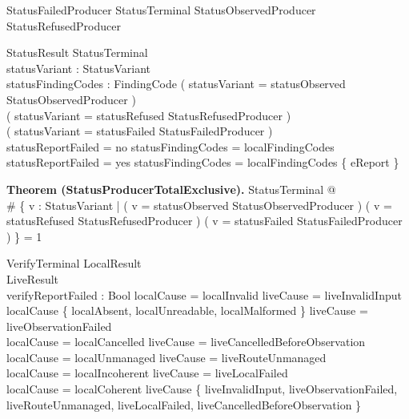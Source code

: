 \documentclass{article}
\makeatletter
\newenvironment{theorem}[1]{\medskip\noindent\textbf{Theorem (#1).}\@nameuse{zed}}{\@nameuse{endzed}}
\makeatother
\begin{document}
\begin{schema}{StatusFailedProducer}
	StatusTerminal
	\where
	\lnot StatusObservedProducer \land \lnot StatusRefusedProducer
\end{schema}

\begin{schema}{StatusResult}
	StatusTerminal \\
	statusVariant : StatusVariant \\
	statusFindingCodes : \power FindingCode
	\where
	( statusVariant = statusObserved \iff StatusObservedProducer ) \\
	( statusVariant = statusRefused \iff StatusRefusedProducer ) \\
	( statusVariant = statusFailed \iff StatusFailedProducer ) \\
	statusReportFailed = no \implies
	statusFindingCodes = localFindingCodes \\
	statusReportFailed = yes \implies
	statusFindingCodes = localFindingCodes \cup \{ eReport \}
\end{schema}

\begin{theorem}{StatusProducerTotalExclusive}
	\forall StatusTerminal @ \\
	\# \{ v : StatusVariant |
	( v = statusObserved \land StatusObservedProducer ) \lor
	( v = statusRefused \land StatusRefusedProducer ) \lor
	( v = statusFailed \land StatusFailedProducer ) \} = 1
\end{theorem}

\begin{schema}{VerifyTerminal}
	LocalResult \\
	LiveResult \\
	verifyReportFailed : Bool
	\where
	localCause = localInvalid \iff liveCause = liveInvalidInput \\
	localCause \in \{ localAbsent, localUnreadable, localMalformed \}
	\iff liveCause = liveObservationFailed \\
	localCause = localCancelled \iff liveCause = liveCancelledBeforeObservation \\
	localCause = localUnmanaged \iff liveCause = liveRouteUnmanaged \\
	localCause = localIncoherent \iff liveCause = liveLocalFailed \\
	localCause = localCoherent \iff liveCause \notin
	\{ liveInvalidInput, liveObservationFailed, liveRouteUnmanaged,
	liveLocalFailed, liveCancelledBeforeObservation \}
\end{schema}
\end{document}
